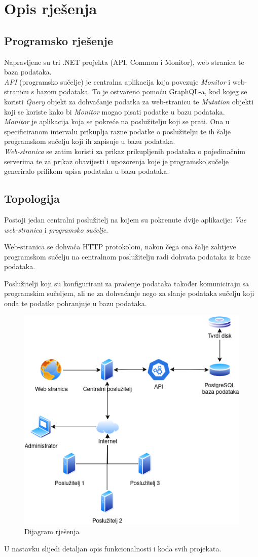 \documentclass[zavrsnirad]{fer}
\begin{document}
\chapter{Opis rješenja}
\label{pog:opis_rjesenja}
\section{Programsko rješenje}
Napravljene su tri .NET projekta (API, Common i Monitor), web stranica te baza podataka.
\\\textit{API} (programsko sučelje) je centralna aplikacija koja povezuje \textit{Monitor} i web-stranicu s bazom podataka. To je ostvareno pomoću GraphQL-a, kod kojeg se koristi \textit{Query} objekt za dohvaćanje podatka za web-stranicu te \textit{Mutation} objekti koji se koriste kako bi \textit{Monitor} mogao pisati podatke u bazu podataka.
\\\textit{Monitor} je aplikacija koja se pokreće na poslužitelju koji se prati. Ona u specificiranom intervalu prikuplja razne podatke o poslužitelju te ih šalje programskom sučelju koji ih zapisuje u bazu podataka.
\\\textit{Web-stranica} se zatim koristi za prikaz prikupljenih podataka o pojedinačnim serverima te za prikaz obavijesti i upozorenja koje je programsko sučelje generiralo prilikom upisa podataka u bazu podataka.

\section{Topologija}
Postoji jedan centralni poslužitelj na kojem su pokrenute dvije aplikacije: \textit{Vue web-stranica} i \textit{programsko sučelje}.

Web-stranica se dohvaća HTTP protokolom, nakon čega ona šalje zahtjeve programskom sučelju na centralnom poslužitelju radi dohvata podataka iz baze podataka.

Poslužitelji koji su konfigurirani za praćenje podataka također komuniciraju sa programskim sučeljem, ali ne za dohvaćanje nego za slanje podataka sučelju koji onda te podatke pohranjuje u bazu podataka.
\begin{figure}[htb!]
	\centering
	\includegraphics[width=0.6\linewidth]{images/flowchart.png} 
	\caption{Dijagram rješenja}
	\label{slk:flowchart}
\end{figure}
\FloatBarrier
U nastavku slijedi detaljan opis funkcionalnosti i koda svih projekata.
\end{document}
